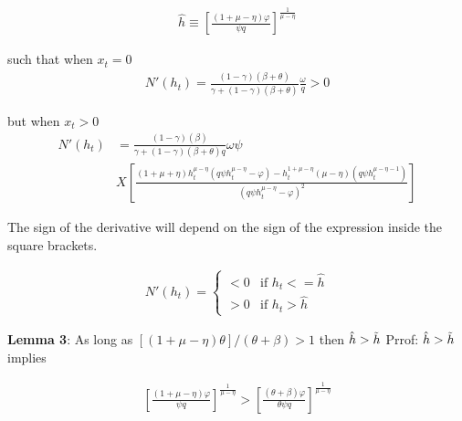     \begin{equation}
    \begin{aligned}
    \hat{h} \equiv \left[\frac{(1+\mu - \eta)\varphi}{\psi q}\right]^{\frac{1}{\mu - \eta}}
    \end{aligned}
    \end{equation}

such that when $x_t = 0$
    \begin{equation}
    \begin{aligned}
        N'(h_t) = \frac{(1-\gamma)(\beta +  \theta)}{\gamma + (1-\gamma)(\beta + \theta)}\frac{\omega}{q} > 0 
    \end{aligned}
    \end{equation}

but when $x_t > 0$
    \begin{equation}
    \begin{aligned}
        N'(h_t) & = \frac{(1-\gamma)(\beta)}{\gamma + (1-\gamma)(\beta + \theta)q}\omega\psi \\
        & X\left[\frac{(1+\mu + \eta)h_{t}^{\mu - \eta} (q \psi h_{t}^{\mu - \eta} - \varphi) - h_{t}^{1+\mu - \eta}(\mu - \eta)(q \psi h_{t}^{\mu - \eta -1})}{(q \psi h_{t}^{\mu - \eta} - \varphi)^{2}} \right]
    \end{aligned}
    \end{equation}

The sign of the derivative will depend on the sign of the expression inside the square brackets. 

    \begin{equation}
    \begin{aligned}
    N'(h_t) = \begin{cases}
                    < 0     & \text{if } h_t <= \hat{h} \\
                    > 0     & \text{if } h_t > \hat{h}
                     \end{cases}
    \end{aligned}
    \end{equation}

\textbf{Lemma 3}: 
As long as $[(1+\mu - \eta )\theta]/(\theta + \beta)>1$ then $\hat{h} > \Tilde{h}$
Prrof: $\hat{h} > \Tilde{h}$ implies

    \begin{equation}
    \begin{aligned}
    \left[\frac{(1+\mu - \eta)\varphi}{\psi q}\right]^{\frac{1}{\mu - \eta}} >  \left[\frac{(\theta + \beta)\varphi}{\theta \psi q}\right]^{\frac{1}{\mu - \eta}}
    \end{aligned}
    \end{equation}

